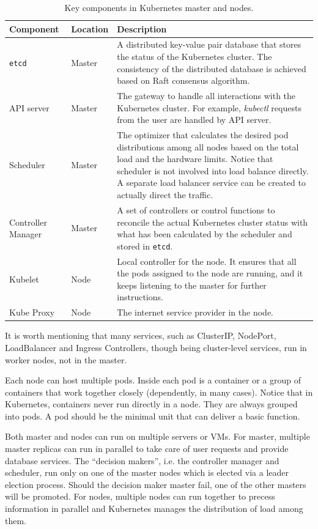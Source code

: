 \begin{table}[!htb]
	\centering
	\caption{Key components in Kubernetes master and nodes.} \label{ch:vac:tab:keycomponents}
	\begin{tabularx}{\textwidth}{llX}
		\hline
		Component & Location & Description \\
		\hline
		\verb|etcd| & Master & A distributed key-value pair database that stores the status of the Kubernetes cluster. The consistency of the distributed database is achieved based on Raft consensus algorithm. \\ \hline
		API server & Master & The gateway to handle all interactions with the Kubernetes cluster. For example, \textit{kubectl} requests from the user are handled by API server. \\ \hline
		Scheduler & Master & The optimizer that calculates the desired pod distributions among all nodes based on the total load and the hardware limits. Notice that scheduler is not involved into load balance directly. A separate load balancer service can be created to actually direct the traffic. \\ \hline
		Controller Manager & Master & A set of controllers or control functions to reconcile the actual Kubernetes cluster status with what has been calculated by the scheduler and stored in \verb|etcd|. \\ \hline
		Kubelet & Node & Local controller for the node. It ensures that all the pods assigned to the node are running, and it keeps listening to the master for further instructions. \\ \hline
		Kube Proxy & Node & The internet service provider in the node. \\
		\hline
	\end{tabularx}
\end{table}

It is worth mentioning that many services, such as ClusterIP, NodePort, LoadBalancer and Ingress Controllers, though being cluster-level services, run in worker nodes, not in the master. 

Each node can host multiple pods. Inside each pod is a container or a group of containers that work together closely (dependently, in many cases). Notice that in Kubernetes, containers never run directly in a node. They are always grouped into pods. A pod should be the minimal unit  that can deliver a basic function.

Both master and nodes can run on multiple servers or VMs. For master, multiple master replicas can run in parallel to take care of user requests and provide database services. The ``decision makers'', i.e. the controller manager and scheduler, run only on one of the master nodes which is elected via a leader election process. Should the decision maker master fail, one of the other masters will be promoted. For nodes, multiple nodes can run together to precess information in parallel and Kubernetes manages the distribution of load among them.

